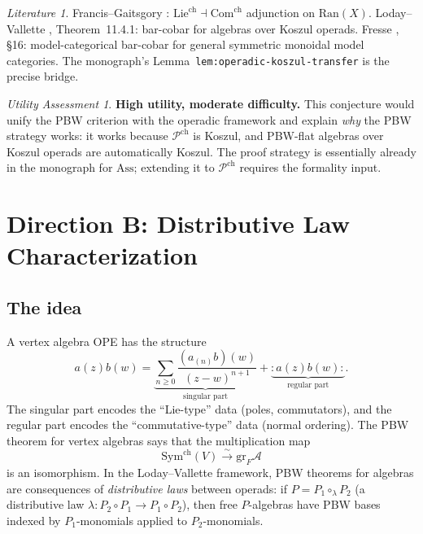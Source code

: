 \documentclass[11pt]{article}
\theoremstyle{definition}
\theoremstyle{remark}
\newtheorem*{assessment}{Utility Assessment}
\newtheorem*{literature}{Literature}
\newcommand{\Pch}{\mathcal{P}^{\mathrm{ch}}}
\newcommand{\cA}{\mathcal{A}}
\begin{document}
\begin{literature}
Francis--Gaitsgory \cite{FG12}: $\mathrm{Lie}^{\mathrm{ch}}
\dashv \mathrm{Com}^{\mathrm{ch}}$ adjunction on $\mathrm{Ran}(X)$.
Loday--Vallette \cite{LV12}, Theorem~11.4.1: bar-cobar for
algebras over Koszul operads.  Fresse \cite{Fresse-operads},
\S16: model-categorical bar-cobar for general symmetric monoidal
model categories.  The monograph's
Lemma~\texttt{lem:operadic-koszul-transfer} is the precise bridge.
\end{literature}

\begin{assessment}
\textbf{High utility, moderate difficulty.}  This conjecture would
unify the PBW criterion with the operadic framework and explain
\emph{why} the PBW strategy works: it works because $\Pch$ is
Koszul, and PBW-flat algebras over Koszul operads are automatically
Koszul.  The proof strategy is essentially already in the monograph
for $\mathrm{Ass}$; extending it to $\Pch$ requires the formality
input.
\end{assessment}

\section{Direction B: Distributive Law Characterization}

\subsection{The idea}

A vertex algebra OPE has the structure
\[
a(z) b(w) = \underbrace{\sum_{n \geq 0}
\frac{(a_{(n)} b)(w)}{(z-w)^{n+1}}}_{\text{singular part}}
+ \underbrace{:a(z)b(w):}_{\text{regular part}}.
\]
The singular part encodes the ``Lie-type'' data (poles, commutators),
and the regular part encodes the ``commutative-type'' data (normal
ordering).  The PBW theorem for vertex algebras says that the
multiplication map
\[
\mathrm{Sym}^{\mathrm{ch}}(V) \xrightarrow{\sim} \mathrm{gr}_F \cA
\]
is an isomorphism.  In the Loday--Vallette framework, PBW theorems
for algebras are consequences of \emph{distributive laws} between
operads: if $P = P_1 \circ_\lambda P_2$ (a distributive law
$\lambda: P_2 \circ P_1 \to P_1 \circ P_2$), then free
$P$-algebras have PBW bases indexed by $P_1$-monomials applied to
$P_2$-monomials.
\end{document}
